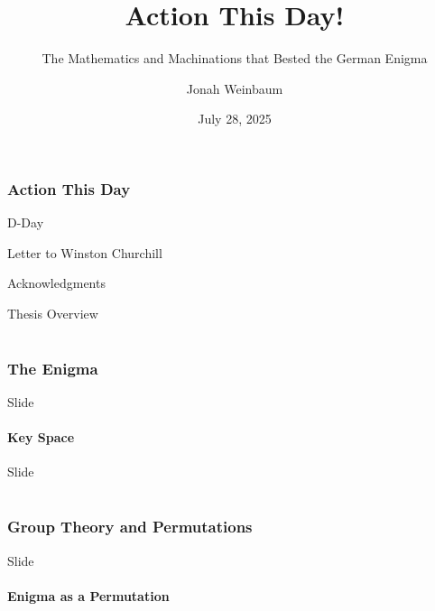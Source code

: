 \documentclass[hyphens,aspectratio=169]{beamer}
\title{Action This Day!}
\subtitle{The Mathematics and Machinations that Bested the German Enigma}
\author{Jonah Weinbaum}
\date{
July 28, 2025
}
\begin{document}
\frame{\titlepage}

\section{Action This Day}

\begin{frame}[fragile]{D-Day}
\end{frame}

\begin{frame}[fragile]{Letter to Winston Churchill}
\end{frame}

\begin{frame}[fragile]{Acknowledgments}
\end{frame}

\begin{frame}[fragile]{Thesis Overview}
\end{frame}

\part{}

\section{The Enigma}

\begin{frame}[fragile]{Slide}
\end{frame}

\subsection{Key Space}

\begin{frame}[fragile]{Slide}
\end{frame}

\part{}

\section{Group Theory and Permutations}

\begin{frame}[fragile]{Slide}
\end{frame}

\subsection{Enigma as a Permutation}
\end{document}

